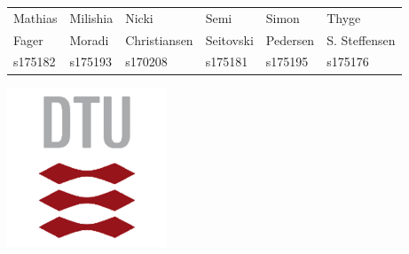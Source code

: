 \begin{titlingpage}
\begin{adjustbox}{center}
\begin{tabular}{llllll}
                \\ %
                     Mathias & Milishia & Nicki & Semi & Simon & Thyge
                \\
                Fager & Moradi & Christiansen & Seitovski & Pedersen & S. Steffensen
                \\
                s175182 & s175193 & s170208 & s175181 & s175195 &s175176
                \end{tabular}
                
                \label{tab:my_label}
        \end{adjustbox}
        \vspace{.5cm}
        \begin{center}
            \includegraphics{fig/dtu/DTU_small.png}
        \end{center}
    \end{titlingpage}